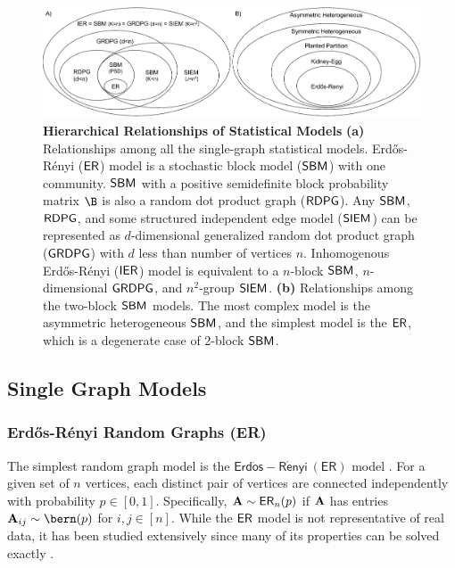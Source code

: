 \begin{figure}
    \centering
    \includegraphics[width=\textwidth]{figures/dnd/models_combined}
    \caption{\textbf{Hierarchical Relationships of Statistical Models} 
    \textbf{(a)} Relationships among all the single-graph statistical models. Erd\H os-R\'enyi ($\operatorname{\mathsf{ER}}$) model is a stochastic block model ($\operatorname{\mathsf{SBM}}$) with one community. $\operatorname{\mathsf{SBM}}$ with a positive semidefinite block probability matrix $\B$ is also a random dot product graph ($\operatorname{\mathsf{RDPG}}$). Any $\operatorname{\mathsf{SBM}}$, $\operatorname{\mathsf{RDPG}}$, and some structured independent edge model ($\operatorname{\mathsf{SIEM}}$) can be represented as $d$-dimensional generalized random dot product graph ($\operatorname{\mathsf{GRDPG}}$) with $d$ less than number of vertices $n$. Inhomogenous Erd\H os-R\'enyi ($\operatorname{\mathsf{IER}}$) model is equivalent to a $n$-block $\operatorname{\mathsf{SBM}}$, $n$-dimensional $\operatorname{\mathsf{GRDPG}}$, and $n^2$-group $\operatorname{\mathsf{SIEM}}$.
    \textbf{(b)} Relationships among the two-block $\operatorname{\mathsf{SBM}}$ models. The most complex model is the asymmetric heterogeneous $\operatorname{\mathsf{SBM}}$, and the simplest model is the $\operatorname{\mathsf{ER}}$, which is a degenerate case of 2-block $\operatorname{\mathsf{SBM}}$.}
    \label{fig:models}
\end{figure}

\subsection{Single Graph Models}\label{sec:single_graph_models}
\subsubsection{Erd\H os-R\'enyi Random Graphs (ER)}\label{sec:uer}
The simplest random graph model is the $\mathsf{Erd\ddot{o}s-R\acute{e}nyi~(ER)}$ model \cite{Erdos1959-zf}. For a given set of $n$ vertices, each distinct pair of vertices are connected independently with probability $p \in [0, 1]$. Specifically, $\operatorname{\mathbf{A}} \sim\operatorname{\mathsf{ER}}_n(p)$ if $\operatorname{\mathbf{A}}$ has entries $\A_{ij}\sim\bern(p)$ for $i, j \in [n]$. While the $\operatorname{\mathsf{ER}}$ model is not representative of real data, it has been studied extensively since many of its properties can be solved exactly  \cite{newman2003random,Rukhin2010}.  

